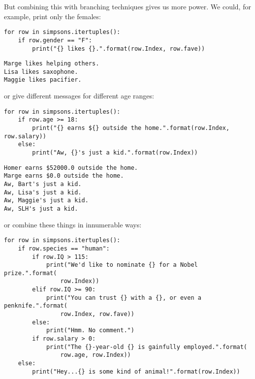 But combining this with branching techniques gives us more power. We could, for
example, print only the females:

\begin{Verbatim}[fontsize=\footnotesize,samepage=true,frame=single,framesep=3mm]
for row in simpsons.itertuples():
    if row.gender == "F":
        print("{} likes {}.".format(row.Index, row.fave))
\end{Verbatim}
\vspace{-.2in}

\begin{Verbatim}[fontsize=\footnotesize,samepage=true,frame=leftline,framesep=5mm,framerule=1mm]
Marge likes helping others.
Lisa likes saxophone.
Maggie likes pacifier.
\end{Verbatim}

or give different messages for different age ranges:

\begin{Verbatim}[fontsize=\footnotesize,samepage=true,frame=single,framesep=3mm]
for row in simpsons.itertuples():
    if row.age >= 18:
        print("{} earns ${} outside the home.".format(row.Index, row.salary))
    else:
        print("Aw, {}'s just a kid.".format(row.Index))
\end{Verbatim}
\vspace{-.2in}

\begin{Verbatim}[fontsize=\footnotesize,samepage=true,frame=leftline,framesep=5mm,framerule=1mm]
Homer earns $52000.0 outside the home.
Marge earns $0.0 outside the home.
Aw, Bart's just a kid.
Aw, Lisa's just a kid.
Aw, Maggie's just a kid.
Aw, SLH's just a kid.
\end{Verbatim}

or combine these things in innumerable ways:

\begin{Verbatim}[fontsize=\small,samepage=true,frame=single,framesep=3mm]
for row in simpsons.itertuples():
    if row.species == "human":
        if row.IQ > 115:
            print("We'd like to nominate {} for a Nobel prize.".format(
                row.Index))
        elif row.IQ >= 90:
            print("You can trust {} with a {}, or even a penknife.".format(
                row.Index, row.fave))
        else:
            print("Hmm. No comment.")
        if row.salary > 0:
            print("The {}-year-old {} is gainfully employed.".format(
                row.age, row.Index))
    else:
        print("Hey...{} is some kind of animal!".format(row.Index))
\end{Verbatim}
\vspace{-.2in}

